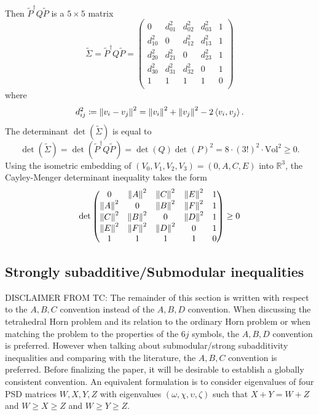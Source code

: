 \documentclass[notitlepage, 10pt]{article}
\begin{document}
Then $\tilde P^{\dagger} Q \tilde P$ is a $5\times 5$ matrix
\begin{equation}
    \tilde \Sigma=
    \tilde P^{\dagger} Q \tilde P = \begin{pmatrix}
        0 & d_{01}^2 & d_{02}^2 & d_{03}^2 & 1 \\
        d_{10}^2 & 0 & d_{12}^2 & d_{13}^2 & 1 \\
        d_{20}^2 & d_{21}^2 & 0 & d_{23}^2 & 1 \\
        d_{30}^2 & d_{31}^2 & d_{32}^2 & 0 & 1 \\
        1 & 1 & 1 & 1 & 0 \\
    \end{pmatrix}
\end{equation}
where
\begin{equation}
    d_{ij}^2 \coloneqq \left\lVert v_i - v_j\right\rVert^{2} = \left\lVert v_i\right\rVert^{2} +\left\lVert v_j\right\rVert^{2} - 2 \braket{v_i, v_j}.
\end{equation}
The determinant $\det(\tilde \Sigma)$ is equal to
\begin{equation}
    \det(\tilde \Sigma) = \det(\tilde P^{\dagger} Q \tilde P) = \det(Q) \det(P)^2 = 8 \cdot (3!)^2 \cdot \mathrm{Vol}^2 \geq 0.
\end{equation}
Using the isometric embedding of $(V_0,V_1,V_2,V_3) = (0,A,C,E)$ into $\mathbb R^3$, the Cayley-Menger determinant inequality takes the form
\begin{equation}
    \det
    \begin{pmatrix}
        0 & \left\lVert A\right\rVert^2 & \left\lVert C\right\rVert^{2} & \left\lVert E\right\rVert^2 & 1 \\
        \left\lVert A\right\rVert^2 & 0 & \left\lVert B\right\rVert^{2} & \left\lVert F\right\rVert^2 & 1\\
        \left\lVert C\right\rVert^2 & \left\lVert B\right\rVert^2 & 0 & \left\lVert D\right\rVert^2 & 1 \\
        \left\lVert E\right\rVert^2 & \left\lVert F\right\rVert^2 & \left\lVert D\right\rVert^2 & 0 & 1 \\
        1 & 1 & 1 & 1 & 0 \\
    \end{pmatrix}
    \geq 0
\end{equation}

\subsection{Strongly subadditive/Submodular inequalities}

{\color{blue}
DISCLAIMER FROM TC:
The remainder of this section is written with respect to the $A,B,C$ convention instead of the $A,B,D$ convention.
When discussing the tetrahedral Horn problem and its relation to the ordinary Horn problem or when matching the problem to the properties of the $6j$ symbols, the $A,B,D$ convention is preferred.
However when talking about submodular/strong subadditivity inequalities and comparing with the literature, the $A,B,C$ convention is preferred.
Before finalizing the paper, it will be desirable to establish a globally consistent convention.
An equivalent formulation is to consider eigenvalues of four PSD matrices $W,X,Y,Z$ with eigenvalues $(\omega, \chi, \upsilon, \zeta)$ such that $X+Y=W+Z$ and $W \geq X \geq Z$ and $W \geq Y \geq Z$.
}
\end{document}
